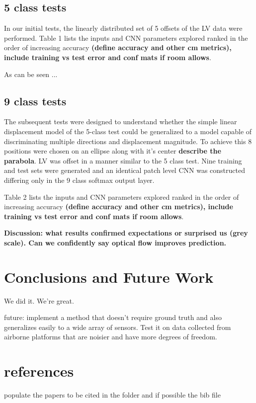 \documentclass{article}
\begin{document}
\subsection{5 class tests}
In our initial tests, the linearly distributed set of 5 offsets of the LV data were performed. Table 1 lists the inputs and CNN parameters explored ranked in the order of increasing accuracy \textbf{(define accuracy and other cm metrics), include training vs test error and conf mats if room allows}.  

As can be seen ... 

\subsection{9 class tests}
The subsequent tests were designed to understand whether the simple linear displacement model of the 5-class test could be generalized to a model capable of discriminating multiple directions and displacement magnitude. To achieve this 8 positions were chosen on an ellipse along with it's center \textbf{describe the parabola}. LV was offset in a manner similar to the 5 class test. Nine training and test sets were generated and an identical patch level CNN was constructed differing only in the 9 class softmax output layer. 

Table 2 lists the inputs and CNN parameters explored ranked in the order of increasing accuracy \textbf{(define accuracy and other cm metrics), include training vs test error and conf mats if room allows}.  

 \textbf{Discussion: what results confirmed expectations or surprised us (grey scale). Can we confidently say optical flow improves prediction. }



\section{Conclusions and Future Work} %
\label{sec:conclusions_and_future_work}
We did it. We're great.

future: implement a method that doesn't require ground truth and also generalizes easily to a wide array of sensors. Test it on data collected from airborne platforms that are noisier and have more degrees of freedom. 



\section{references}
populate the papers to be cited in the folder and if possible the bib file




\end{document}
